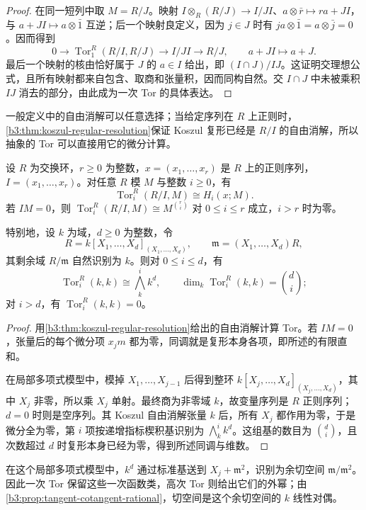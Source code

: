 \begin{proof}
	在同一短列中取 \(M=R/J\)。映射 \(I\otimes_R(R/J)\to I/JI\)、\(a\otimes\bar r\mapsto ra+JI\)，与 \(a+JI\mapsto a\otimes\bar1\) 互逆；后一个映射良定义，因为 \(j\in J\) 时有 \(ja\otimes\bar1=a\otimes\bar j=0\)。因而得到
	\[
		0\longrightarrow\operatorname{Tor}_1^R(R/I,R/J) \longrightarrow I/JI\longrightarrow R/J, \qquad a+JI\longmapsto a+J.
	\]
	最后一个映射的核由恰好属于 \(J\) 的 \(a\in I\) 给出，即 \((I\cap J)/IJ\)。这证明交理想公式，且所有映射都来自包含、取商和张量积，因而同构自然。交 \(I\cap J\) 中未被乘积 \(IJ\) 消去的部分，由此成为一次 Tor 的具体表达。
\end{proof}

一般定义中的自由消解可以任意选择；当给定序列在 \(R\) 上正则时，\cref{b3:thm:koszul-regular-resolution}保证 Koszul 复形已经是 \(R/I\) 的自由消解，所以抽象的 Tor 可以直接用它的微分计算。

\begin{corollary}\label{b3:cor:koszul-tor}
	设 \(R\) 为交换环，\(r\ge0\) 为整数，\(x=(x_1,\ldots,x_r)\) 是 \(R\) 上的正则序列，\(I=(x_1,\ldots,x_r)\)。对任意 \(R\) 模 \(M\) 与整数 \(i\ge0\)，有
	\[
		\operatorname{Tor}_i^R(R/I,M)\cong H_i(x;M).
	\]
	若 \(IM=0\)，则 \(\operatorname{Tor}_i^R(R/I,M)\cong M^{\binom ri}\) 对 \(0\le i\le r\) 成立，\(i>r\) 时为零。

	特别地，设 \(k\) 为域，\(d\ge0\) 为整数，令
	\[
		R=k[X_1,\ldots,X_d]_{(X_1,\ldots,X_d)}, \qquad \mathfrak m=(X_1,\ldots,X_d)R,
	\]
	其剩余域 \(R/\mathfrak m\) 自然识别为 \(k\)。则对 \(0\le i\le d\)，有
	\[
		\operatorname{Tor}_i^R(k,k)\cong\bigwedge_k^ik^d, \qquad \dim_k\operatorname{Tor}_i^R(k,k)=\binom di;
	\]
	对 \(i>d\)，有 \(\operatorname{Tor}_i^R(k,k)=0\)。
\end{corollary}
\begin{proof}
	用\cref{b3:thm:koszul-regular-resolution}给出的自由消解计算 Tor。若 \(IM=0\)，张量后的每个微分项 \(x_jm\) 都为零，同调就是复形本身各项，即所述的有限直和。

	在局部多项式模型中，模掉 \(X_1,\ldots,X_{j-1}\) 后得到整环 \(k[X_j,\ldots,X_d]_{(X_j,\ldots,X_d)}\)，其中 \(X_j\) 非零，所以乘 \(X_j\) 单射。最终商为非零域 \(k\)，故变量序列是 \(R\) 正则序列；\(d=0\) 时则是空序列。其 Koszul 自由消解张量 \(k\) 后，所有 \(X_j\) 都作用为零，于是微分全为零，第 \(i\) 项按递增指标楔积基识别为 \(\bigwedge_k^ik^d\)。这组基的数目为 \(\binom di\)，且次数超过 \(d\) 时复形本身已经为零，得到所述同调与维数。
\end{proof}

在这个局部多项式模型中，\(k^d\) 通过标准基送到 \(X_j+\mathfrak m^2\)，识别为余切空间 \(\mathfrak m/\mathfrak m^2\)。因此一次 Tor 保留这些一次函数类，高次 Tor 则给出它们的外幂；由\cref{b3:prop:tangent-cotangent-rational}，切空间是这个余切空间的 \(k\) 线性对偶。
